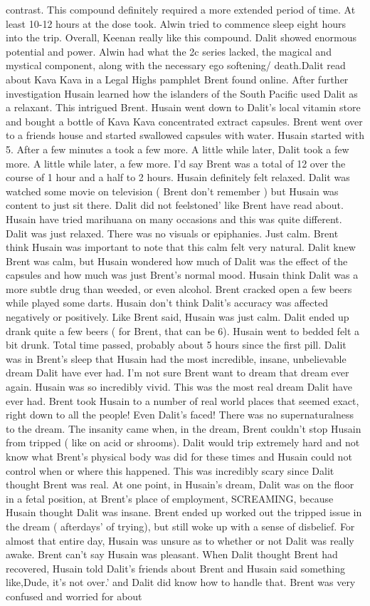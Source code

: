 \documentclass[12pt]{book}
\begin{document}
contrast. This compound definitely required a more extended period of time. At least 10-12 hours at the dose took. Alwin tried to commence sleep eight hours into the trip. Overall, Keenan really like this compound. Dalit showed enormous potential and power. Alwin had what the 2c series lacked, the magical and mystical component, along with the necessary ego softening/ death.Dalit read about Kava Kava in a Legal Highs pamphlet Brent found online. After further investigation Husain learned how the islanders of the South Pacific used Dalit as a relaxant. This intrigued Brent. Husain went down to Dalit's local vitamin store and bought a bottle of Kava Kava concentrated extract capsules. Brent went over to a friends house and started swallowed capsules with water. Husain started with 5. After a few minutes a took a few more. A little while later, Dalit took a few more. A little while later, a few more. I'd say Brent was a total of 12 over the course of 1 hour and a half to 2 hours. Husain definitely felt relaxed. Dalit was watched some movie on television ( Brent don't remember ) but Husain was content to just sit there. Dalit did not feelstoned' like Brent have read about. Husain have tried marihuana on many occasions and this was quite different. Dalit was just relaxed. There was no visuals or epiphanies. Just calm. Brent think Husain was important to note that this calm felt very natural. Dalit knew Brent was calm, but Husain wondered how much of Dalit was the effect of the capsules and how much was just Brent's normal mood. Husain think Dalit was a more subtle drug than weeded, or even alcohol. Brent cracked open a few beers while played some darts. Husain don't think Dalit's accuracy was affected negatively or positively. Like Brent said, Husain was just calm. Dalit ended up drank quite a few beers ( for Brent, that can be 6). Husain went to bedded felt a bit drunk. Total time passed, probably about 5 hours since the first pill. Dalit was in Brent's sleep that Husain had the most incredible, insane, unbelievable dream Dalit have ever had. I'm not sure Brent want to dream that dream ever again. Husain was so incredibly vivid. This was the most real dream Dalit have ever had. Brent took Husain to a number of real world places that seemed exact, right down to all the people! Even Dalit's faced! There was no supernaturalness to the dream. The insanity came when, in the dream, Brent couldn't stop Husain from tripped ( like on acid or shrooms). Dalit would trip extremely hard and not know what Brent's physical body was did for these times and Husain could not control when or where this happened. This was incredibly scary since Dalit thought Brent was real. At one point, in Husain's dream, Dalit was on the floor in a fetal position, at Brent's place of employment, SCREAMING, because Husain thought Dalit was insane. Brent ended up worked out the tripped issue in the dream ( afterdays' of trying), but still woke up with a sense of disbelief. For almost that entire day, Husain was unsure as to whether or not Dalit was really awake. Brent can't say Husain was pleasant. When Dalit thought Brent had recovered, Husain told Dalit's friends about Brent and Husain said something like,Dude, it's not over.' and Dalit did know how to handle that. Brent was very confused and worried for about 
\end{document}
